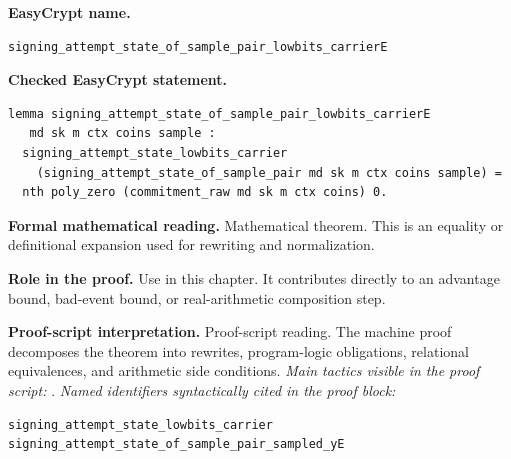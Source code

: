 \begin{formaltheorem}
\noindent\textbf{EasyCrypt name.}
\begin{lstlisting}[language=EasyCrypt,basicstyle=\ttfamily\scriptsize]
signing_attempt_state_of_sample_pair_lowbits_carrierE
\end{lstlisting}
\noindent\textbf{Checked EasyCrypt statement.}
\begin{lstlisting}[language=EasyCrypt,basicstyle=\ttfamily\scriptsize]
lemma signing_attempt_state_of_sample_pair_lowbits_carrierE
   md sk m ctx coins sample :
  signing_attempt_state_lowbits_carrier
    (signing_attempt_state_of_sample_pair md sk m ctx coins sample) =
  nth poly_zero (commitment_raw md sk m ctx coins) 0.
\end{lstlisting}
\noindent\textbf{Formal mathematical reading.}
Mathematical theorem. This is an equality or definitional expansion used for rewriting and normalization.

\noindent\textbf{Role in the proof.}
Use in this chapter. It contributes directly to an advantage bound, bad-event bound, or real-arithmetic composition step.

\noindent\textbf{Proof-script interpretation.}
Proof-script reading. The machine proof decomposes the theorem into rewrites, program-logic obligations, relational equivalences, and arithmetic side conditions.
\emph{Main tactics visible in the proof script:} .
\emph{Named identifiers syntactically cited in the proof block:}
\begin{lstlisting}[language=EasyCrypt,basicstyle=\ttfamily\scriptsize]
signing_attempt_state_lowbits_carrier
signing_attempt_state_of_sample_pair_sampled_yE
\end{lstlisting}

\end{formaltheorem}

